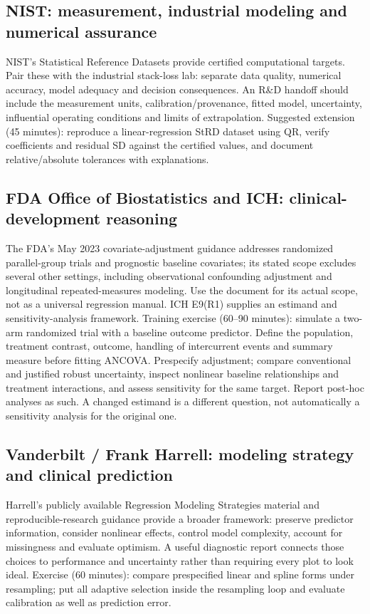 \documentclass[11pt]{article}
\begin{document}
\subsection{NIST: measurement, industrial modeling and numerical assurance}
NIST's Statistical Reference Datasets provide certified computational targets. Pair these with the industrial stack-loss lab: separate data quality, numerical accuracy, model adequacy and decision consequences. An R\&D handoff should include the measurement units, calibration/provenance, fitted model, uncertainty, influential operating conditions and limits of extrapolation. Suggested extension (45 minutes): reproduce a linear-regression StRD dataset using QR, verify coefficients and residual SD against the certified values, and document relative/absolute tolerances with explanations.
\subsection{FDA Office of Biostatistics and ICH: clinical-development reasoning}
The FDA's May 2023 covariate-adjustment guidance addresses randomized parallel-group trials and prognostic baseline covariates; its stated scope excludes several other settings, including observational confounding adjustment and longitudinal repeated-measures modeling. Use the document for its actual scope, not as a universal regression manual. ICH E9(R1) supplies an estimand and sensitivity-analysis framework.
Training exercise (60--90 minutes): simulate a two-arm randomized trial with a baseline outcome predictor. Define the population, treatment contrast, outcome, handling of intercurrent events and summary measure before fitting ANCOVA. Prespecify adjustment; compare conventional and justified robust uncertainty, inspect nonlinear baseline relationships and treatment interactions, and assess sensitivity for the same target. Report post-hoc analyses as such. A changed estimand is a different question, not automatically a sensitivity analysis for the original one.
\subsection{Vanderbilt / Frank Harrell: modeling strategy and clinical prediction}
Harrell's publicly available Regression Modeling Strategies material and reproducible-research guidance provide a broader framework: preserve predictor information, consider nonlinear effects, control model complexity, account for missingness and evaluate optimism. A useful diagnostic report connects those choices to performance and uncertainty rather than requiring every plot to look ideal. Exercise (60 minutes): compare prespecified linear and spline forms under resampling; put all adaptive selection inside the resampling loop and evaluate calibration as well as prediction error.
\end{document}
